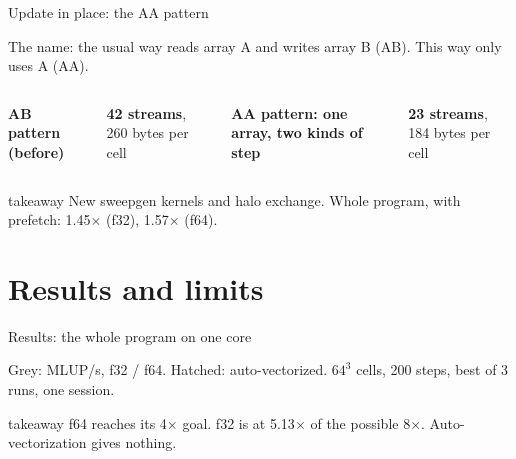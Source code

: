 \documentclass[aspectratio=169,10pt,t]{beamer}
\newcommand{\sx}[1]{#1\ensuremath{\times}} %
\newcommand{\takeaway}[1]{\par\vfill
  \begin{beamercolorbox}[wd=\textwidth,sep=4pt,rounded=true]{takeaway}
    \small #1
  \end{beamercolorbox}}
\begin{document}
\begin{frame}{Update in place: the AA pattern}
  \vspace{1mm}
  {\small The name: the usual way reads array A and writes array B (AB). This way only uses A (AA).\par}
  \begin{columns}[T,onlytextwidth]
    {\small\bfseries AB pattern (before)\par}
    \vspace{3mm}
    \centering

    \vspace{1mm}
    {\small\textbf{42 streams}, 260 bytes per cell\par}
    {\small\bfseries AA pattern: one array, two kinds of step\par}
    \vspace{1mm}
    \centering

    \vspace{1mm}
    {\small\textbf{23 streams}, 184 bytes per cell\par}
  \end{columns}
  \takeaway{New sweepgen kernels and halo exchange. Whole program, with prefetch: \sx{1.45}
    (f32), \sx{1.57} (f64).}
\end{frame}

\section{Results and limits}

\begin{frame}{Results: the whole program on one core}
  \vspace{1mm}
  \centering

  \vspace{0.5mm}
  {\scriptsize\color{psgray}Grey: MLUP/s, f32 / f64. Hatched: auto-vectorized. $64^3$ cells, 200 steps,
  best of 3 runs, one session.\par}
  \takeaway{f64 reaches its \sx{4} goal. f32 is at \sx{5.13} of the possible \sx{8}.
    Auto-vectorization gives nothing.}
\end{frame}
\end{document}
